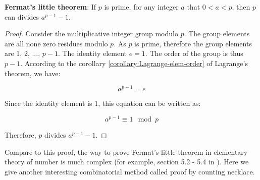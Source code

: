 \documentclass{article}
\begin{document}
\begin{theorem}
\textbf{Fermat's little theorem}: If $p$ is prime, for any integer $a$ that $0 < a < p$, then $p$ can divides $a^{p-1}-1$.
\end{theorem}

\begin{proof}
Consider the multiplicative integer group modulo $p$. The group elements are all none zero residues modulo $p$. As $p$ is prime, therefore the group elements are 1, 2, ..., $p-1$. The identity element $e = 1$. The order of the group is thus $p-1$. According to the corollary \ref{corollary:Lagrange-elem-order} of Lagrange's theorem, we have:

\[
a^{p-1} = e
\]

Since the identity element is 1, this equation can be written as:

\[
a^{p-1} \equiv 1 \mod p
\]

Therefore, $p$ divides $a^{p-1} - 1$.
\end{proof}

Compare to this proof, the way to prove Fermat's little theorem in elementary theory of number is much complex (for example, section 5.2 - 5.4 in \cite{StepanovRose15}). Here we give another interesting combinatorial method called proof by counting necklace\cite{Wiki-FLT-proof}.
\end{document}

